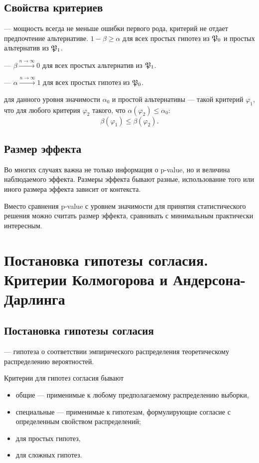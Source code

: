 \documentclass[11pt]{book}
\begin{document}
\subsection{Свойства критериев}
\begin{definition}[]
	 --- мощность всегда не меньше ошибки первого рода, критерий не отдает предпочтение альтернативе. $1 - \beta \ge \alpha$ для всех простых гипотез из $\mathfrak{P}_0$ и простых альтернатив из $\mathfrak{P}_1$.
\end{definition}
\begin{definition}[]
	 --- $\beta \xrightarrow{n \to \infty} 0$ для всех простых альтернатив из $\mathfrak{P}_1$.
\end{definition}
\begin{definition}[]
	 --- $\alpha \xrightarrow{n \to \infty} 1$ для всех простых гипотез из $\mathfrak{P}_0$.
\end{definition}
\begin{definition}[]
	 для данного уровня значимости $\alpha_0$ и простой альтернативы --- такой критерий $\varphi_1$, что для любого критерия $\varphi_2$ такого, что $\alpha(\varphi_2) \le \alpha_0$:
	\[
	\beta(\varphi_1) \le \beta(\varphi_2)
	.\] 
\end{definition}
\subsection{Размер эффекта}
Во многих случаях важна не только информация о p-value, но и величина наблюдаемого эффекта. Размеры эффекта бывают разные, использование того или иного размера эффекта зависит от контекста.

Вместо сравнения p-value с уровнем значимости для принятия статистического решения можно считать размер эффекта, сравнивать с минимальным практически интересным.

\section{Постановка гипотезы согласия. Критерии Колмогорова и Андерсона-Дарлинга}
\subsection{Постановка гипотезы согласия}
\begin{definition}[]
	 --- гипотеза о соответствии эмпирического распределения теоретическому распределению вероятностей. 
\end{definition}
Критерии для гипотез согласия бывают
\begin{itemize}
	\item общие --- применимые к любому предполагаемому распределению выборки,
	\item специальные --- применимые к гипотезам, формулирующие согласие с определенным свойством распределений;
\end{itemize}
\begin{itemize}
	\item для простых гипотез,
	\item для сложных гипотез.
\end{itemize}
\end{document}
